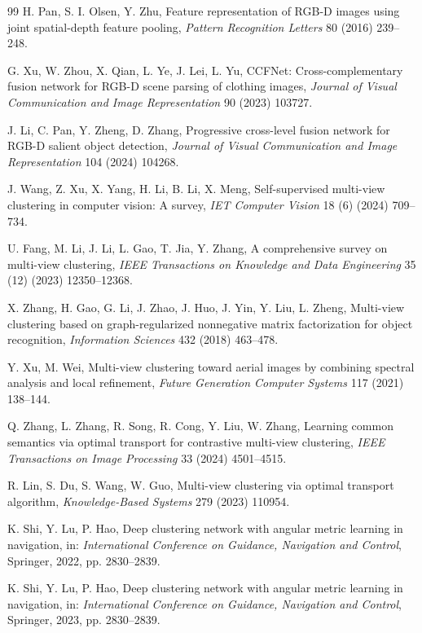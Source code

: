 \documentclass[11pt, a4paper]{article}
\begin{document}
{{{\begin{thebibliography}{99}
H. Pan, S. I. Olsen, Y. Zhu, Feature representation of RGB-D images using joint spatial-depth feature pooling, \textit{Pattern Recognition Letters} 80 (2016) 239--248.

G. Xu, W. Zhou, X. Qian, L. Ye, J. Lei, L. Yu, CCFNet: Cross-complementary fusion network for RGB-D scene parsing of clothing images, \textit{Journal of Visual Communication and Image Representation} 90 (2023) 103727.

J. Li, C. Pan, Y. Zheng, D. Zhang, Progressive cross-level fusion network for RGB-D salient object detection, \textit{Journal of Visual Communication and Image Representation} 104 (2024) 104268.

J. Wang, Z. Xu, X. Yang, H. Li, B. Li, X. Meng, Self-supervised multi-view clustering in computer vision: A survey, \textit{IET Computer Vision} 18 (6) (2024) 709--734.

U. Fang, M. Li, J. Li, L. Gao, T. Jia, Y. Zhang, A comprehensive survey on multi-view clustering, \textit{IEEE Transactions on Knowledge and Data Engineering} 35 (12) (2023) 12350--12368.

X. Zhang, H. Gao, G. Li, J. Zhao, J. Huo, J. Yin, Y. Liu, L. Zheng, Multi-view clustering based on graph-regularized nonnegative matrix factorization for object recognition, \textit{Information Sciences} 432 (2018) 463--478.

Y. Xu, M. Wei, Multi-view clustering toward aerial images by combining spectral analysis and local refinement, \textit{Future Generation Computer Systems} 117 (2021) 138--144.

Q. Zhang, L. Zhang, R. Song, R. Cong, Y. Liu, W. Zhang, Learning common semantics via optimal transport for contrastive multi-view clustering, \textit{IEEE Transactions on Image Processing} 33 (2024) 4501--4515.

R. Lin, S. Du, S. Wang, W. Guo, Multi-view clustering via optimal transport algorithm, \textit{Knowledge-Based Systems} 279 (2023) 110954.

K. Shi, Y. Lu, P. Hao, Deep clustering network with angular metric learning in navigation, in: \textit{International Conference on Guidance, Navigation and Control}, Springer, 2022, pp. 2830--2839.

K. Shi, Y. Lu, P. Hao, Deep clustering network with angular metric learning in navigation, in: \textit{International Conference on Guidance, Navigation and Control}, Springer, 2023, pp. 2830--2839.


\end{thebibliography}}}}
\end{document}
